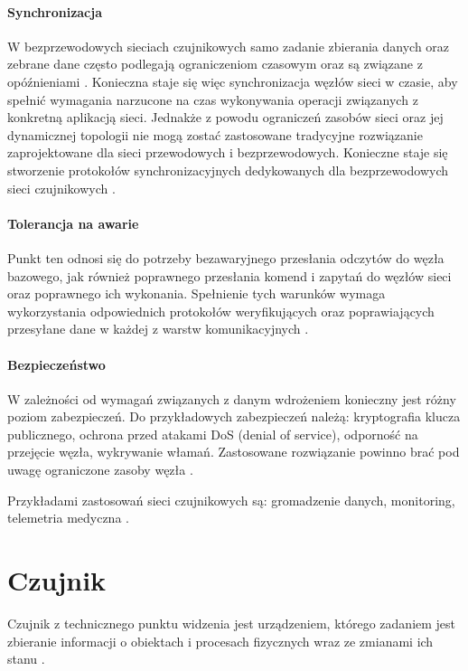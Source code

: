 \paragraph{Synchronizacja}
W bezprzewodowych sieciach czujnikowych samo zadanie zbierania danych oraz zebrane dane często podlegają ograniczeniom czasowym oraz są związane z opóźnieniami \cite{Alnuaimi2011}. Konieczna staje się więc synchronizacja węzłów sieci w czasie, aby spełnić wymagania narzucone na czas wykonywania operacji związanych z konkretną aplikacją sieci. Jednakże z powodu ograniczeń zasobów sieci oraz jej dynamicznej topologii nie mogą zostać zastosowane tradycyjne rozwiązanie zaprojektowane dla sieci przewodowych i bezprzewodowych. Konieczne staje się stworzenie protokołów synchronizacyjnych dedykowanych dla bezprzewodowych sieci czujnikowych \cite{Howitt2006}.

\paragraph{Tolerancja na awarie}
Punkt ten odnosi się do potrzeby bezawaryjnego przesłania odczytów do węzła bazowego, jak również poprawnego przesłania komend i zapytań do węzłów sieci oraz poprawnego ich wykonania. Spełnienie tych warunków wymaga wykorzystania odpowiednich protokołów weryfikujących oraz poprawiających przesyłane dane w każdej z warstw komunikacyjnych \cite{Kakamanshadi2015}.

\paragraph{Bezpieczeństwo}
W zależności od wymagań związanych z danym wdrożeniem konieczny jest różny poziom zabezpieczeń. Do przykładowych zabezpieczeń należą: kryptografia klucza publicznego, ochrona przed atakami DoS (denial of service), odporność na przejęcie węzła, wykrywanie włamań. Zastosowane rozwiązanie powinno brać pod uwagę ograniczone zasoby węzła \cite{Pathan2010}.

\bigskip

Przykładami zastosowań sieci czujnikowych są: gromadzenie danych, monitoring, telemetria medyczna \cite{Biradar2009}.

\section{Czujnik}
Czujnik z technicznego punktu widzenia jest urządzeniem, którego zadaniem jest zbieranie informacji o obiektach i procesach fizycznych wraz ze zmianami ich stanu \cite{Dargie2010}.

